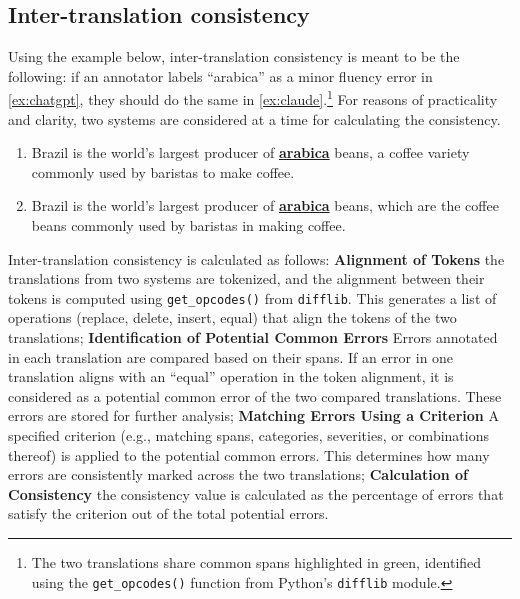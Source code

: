 \subsection{Inter-translation consistency}\label{appendix:itc_pseudo_code}

Using the example below, inter-translation consistency is meant to be the following: if an annotator labels ``arabica'' as a minor fluency error in \ref{ex:chatgpt}, they should do the same in \ref{ex:claude}.\footnote{The two translations share common spans highlighted in green, identified using the \texttt{get\_opcodes()} function from Python's \texttt{difflib} module.} For reasons of practicality and clarity, two systems are considered at a time for calculating the consistency.

\begin{enumerate}[label=(\alph*)]
    \item {\color{gglgreen}Brazil is the world's largest producer of \underline{\textbf{arabica}} beans,} a {\color{gglgreen}coffee} variety {\color{gglgreen}commonly used by baristas} to make {\color{gglgreen}coffee}.\label{ex:chatgpt}
    \vspace{-6pt}
    
    \item {\color{gglgreen}Brazil is the world's largest producer of \underline{\textbf{arabica}} beans,} which are the {\color{gglgreen}coffee} beans {\color{gglgreen}commonly used by baristas} in making {\color{gglgreen}coffee}.\label{ex:claude}
\end{enumerate}

Inter-translation consistency is calculated as follows: \textbf{Alignment of Tokens} the translations from two systems are tokenized, and the alignment between their tokens is computed using \texttt{get\_opcodes()} from \texttt{difflib}. This generates a list of operations (replace, delete, insert, equal) that align the tokens of the two translations; \textbf{Identification of Potential Common Errors} Errors annotated in each translation are compared based on their spans. If an error in one translation aligns with an ``equal'' operation in the token alignment, it is considered as a potential common error of the two compared translations. These errors are stored for further analysis; \textbf{Matching Errors Using a Criterion} A specified criterion (e.g., matching spans, categories, severities, or combinations thereof) is applied to the potential common errors. This determines how many errors are consistently marked across the two translations; \textbf{Calculation of Consistency} the consistency value is calculated as the percentage of errors that satisfy the criterion out of the total potential errors. 

